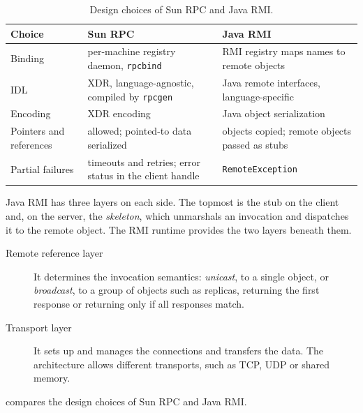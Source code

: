 \documentclass[../main.tex]{subfiles}
\begin{document}
\begin{table}[htbp]
  \centering
  \caption{Design choices of Sun RPC and Java RMI.}
  \label{tab:l13-design}
  \small
  \begin{tabular}{@{}>{\raggedright}p{22mm}>{\raggedright}p{45mm}%
      >{\raggedright\arraybackslash}p{45mm}@{}}
    \toprule
    Choice & Sun RPC & Java RMI \\
    \midrule
    Binding & per-machine registry daemon, \texttt{rpcbind}
      & RMI registry maps names to remote objects \\
    \addlinespace
    IDL & XDR, language-agnostic, compiled by \texttt{rpcgen}
      & Java remote interfaces, language-specific \\
    \addlinespace
    Encoding & XDR encoding & Java object serialization \\
    \addlinespace
    Pointers and references & allowed; pointed-to data serialized
      & objects copied; remote objects passed as stubs \\
    \addlinespace
    Partial failures & timeouts and retries; error status in the client
      handle & \texttt{RemoteException} \\
    \bottomrule
  \end{tabular}
\end{table}

Java RMI has three layers on each side.  The topmost is the stub on the
client and, on the server, the \emph{skeleton}, which unmarshals an
invocation and dispatches it to the remote object.  The RMI runtime
provides the two layers beneath them.
\begin{description}
  \item[Remote reference layer] It determines the invocation semantics:
    \emph{unicast}, to a single object, or \emph{broadcast}, to a group of
    objects such as replicas, returning the first response or returning
    only if all responses match.
  \item[Transport layer] It sets up and manages the connections and
    transfers the data.  The architecture allows different transports, such
    as TCP, UDP or shared memory.
\end{description}
 compares the design choices of Sun RPC and Java
RMI.
\end{document}
